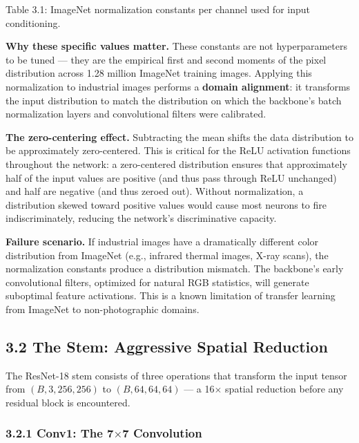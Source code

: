 \documentclass[12pt, a4paper, oneside]{report}
\begin{document}
Table 3.1: ImageNet normalization constants per channel used for input conditioning.

\textbf{Why these specific values matter.} These constants are not hyperparameters to be tuned --- they are the empirical first and second moments of the pixel distribution across 1.28 million ImageNet training images. Applying this normalization to industrial images performs a \textbf{domain alignment}: it transforms the input distribution to match the distribution on which the backbone's batch normalization layers and convolutional filters were calibrated.

\textbf{The zero-centering effect.} Subtracting the mean shifts the data distribution to be approximately zero-centered. This is critical for the ReLU activation functions throughout the network: a zero-centered distribution ensures that approximately half of the input values are positive (and thus pass through ReLU unchanged) and half are negative (and thus zeroed out). Without normalization, a distribution skewed toward positive values would cause most neurons to fire indiscriminately, reducing the network's discriminative capacity.

\textbf{Failure scenario.} If industrial images have a dramatically different color distribution from ImageNet (e.g., infrared thermal images, X-ray scans), the normalization constants produce a distribution mismatch. The backbone's early convolutional filters, optimized for natural RGB statistics, will generate suboptimal feature activations. This is a known limitation of transfer learning from ImageNet to non-photographic domains.

\bigskip\noindent\hrulefill\bigskip

\subsection{3.2 The Stem: Aggressive Spatial Reduction}\label{the-stem-aggressive-spatial-reduction}

The ResNet-18 stem consists of three operations that transform the input tensor from \((B, 3, 256, 256)\) to \((B, 64, 64, 64)\) --- a 16$\times$ spatial reduction before any residual block is encountered.

\subsubsection{3.2.1 Conv1: The 7$\times$7 Convolution}\label{conv1-the-77-convolution}
\end{document}

